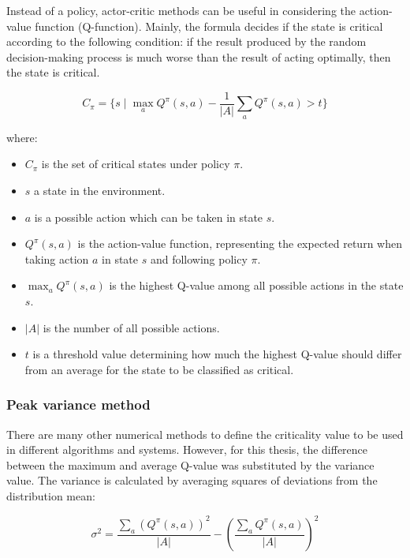 Instead of a policy, actor-critic methods can be useful in considering the action-value function (Q-function). Mainly, the formula decides if the state is critical according to the following condition: if the result produced by the random decision-making process is much worse than the result of acting optimally, then the state is critical.

\begin{equation}
    C_{\pi} = \{ s \mid \max_{a} Q^{\pi}(s, a) - \frac{1}{|A|} \sum_{a} Q^{\pi}(s, a) > t \}
    \label{eq:criticality_threshold_2}
\end{equation}

where:
\begin{itemize}
    \item \( C_{\pi} \) is the set of critical states under policy \( \pi \).
    \item \( s \) a state in the environment.
    \item \( a \) is a possible action which can be taken in state \( s \).
    \item \( Q^{\pi}(s, a) \) is the action-value function, representing the expected return when taking action \( a \) in state \( s \) and following policy \( \pi \).
    \item \( \max_{a} Q^{\pi}(s, a) \) is the highest Q-value among all possible actions in the state \( s \).
    \item \( |A| \) is the number of all possible actions.
    \item \( t \) is a threshold value determining how much the highest Q-value should differ from an average for the state to be classified as critical.
\end{itemize}

\subsubsection{Peak variance method}

There are many other numerical methods to define the criticality value to be used in different algorithms and systems. However, for this thesis, the difference between the maximum and average Q-value was substituted by the variance value. The variance is calculated by averaging squares of deviations from the distribution mean:

\begin{equation}
    \sigma^2 = \frac{\sum_{a} (Q^{\pi}(s, a))^2}{|A|} - \left(\frac{\sum_{a} Q^{\pi}(s, a)}{|A|} \right)^2
    \label{eq:variance}
\end{equation}


